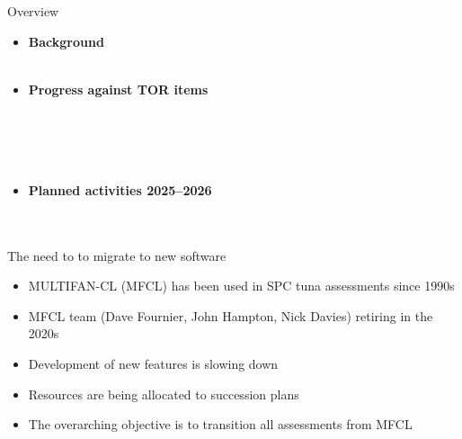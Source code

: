 \documentclass[aspectratio=169,fleqn]{beamer}
\begin{document}
\begin{frame}{Overview}
  \begin{itemize}
    \item[] {\bf\darkblue Background}\\[0.1ex]
    \\[4ex]
    \item[] {\bf\darkblue Progress against TOR items}\\[0.1ex]
    \\[0.1ex]
    \\[0.1ex]
    \\[0.1ex]
    \\[4ex]
    \item[] {\bf\darkblue Planned activities 2025--2026}\\[0.1ex]
    \\[0.1ex]
    \\[2ex]
  \end{itemize}
\end{frame}


\begin{frame}{The need to to migrate to new software}\small
  \begin{itemize}
    \item[] MULTIFAN-CL (MFCL) has been used in SPC tuna assessments since
    1990s\\[5ex]
    \item[] MFCL team (Dave Fournier, John Hampton, Nick Davies) retiring in the
    2020s\\[5ex]
    \item[] Development of new features is slowing down\\[5ex]
    \item[] Resources are being allocated to succession plans\\[5ex]
    \item[] The overarching objective is to
    {\darkgreen transition all assessments from MFCL}\\[4ex]
  \end{itemize}
\end{frame}
\end{document}
